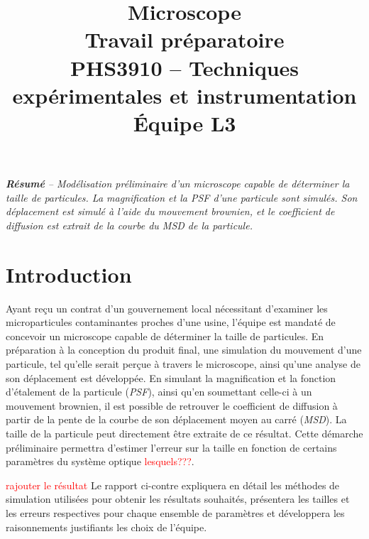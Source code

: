 \documentclass[conference]{IEEEtran}
\begin{document}
\title{Microscope\\
\large Travail préparatoire \\
PHS3910 -- Techniques expérimentales et instrumentation\\ 
Équipe L3}

\author{
\and
{}
\and
{}
\and
{}
}

\maketitle

\textit{\textbf{Résumé} -- Modélisation préliminaire d'un microscope capable de déterminer la taille de 
particules. La magnification et la PSF d'une particule sont simulés. Son déplacement est simulé à l'aide du
mouvement brownien, et le coefficient de diffusion est extrait de la courbe du MSD de la particule. }
\section{Introduction}
Ayant reçu un contrat d'un gouvernement local nécessitant d'examiner les microparticules contaminantes proches d'une
usine, l'équipe est mandaté de concevoir un microscope capable de déterminer la taille de particules. En préparation à la conception
du produit final, une simulation du mouvement d'une particule, tel qu'elle serait perçue à travers le microscope, ainsi qu'une
analyse de son déplacement est développée. En simulant la magnification et la fonction d'étalement de la particule (\textit{PSF}), ainsi qu'en soumettant
celle-ci à un mouvement brownien, il est possible
de retrouver le coefficient de diffusion à partir de la pente de la courbe de son déplacement moyen au carré (\textit{MSD}).
La taille de la particule peut directement être extraite de ce résultat. Cette démarche préliminaire permettra
d'estimer l'erreur sur la taille en fonction de certains paramètres du système optique \textcolor{red}{lesquels???}.

\textcolor{red}{rajouter le résultat} Le rapport ci-contre expliquera en détail les méthodes de simulation utilisées pour obtenir 
les résultats souhaités, présentera les tailles et les erreurs respectives pour chaque ensemble de paramètres et développera les raisonnements
justifiants les choix de l'équipe.
\end{document}
